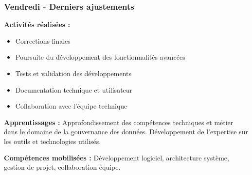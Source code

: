 \subsubsection{Vendredi - Derniers ajustements}

\textbf{Activités réalisées :}
\begin{itemize}
    \item Corrections finales
    \item Poursuite du développement des fonctionnalités avancées
    \item Tests et validation des développements
    \item Documentation technique et utilisateur
    \item Collaboration avec l'équipe technique
\end{itemize}

\textbf{Apprentissages :}
Approfondissement des compétences techniques et métier dans le domaine de la gouvernance des données. Développement de l'expertise sur les outils et technologies utilisés.

\textbf{Compétences mobilisées :}
Développement logiciel, architecture système, gestion de projet, collaboration équipe.

